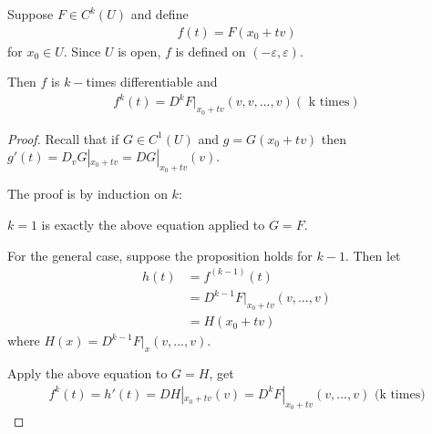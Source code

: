 \documentclass[a4paper]{article}
\begin{document}
\begin{prop}
Suppose $F \in C^k (U)$ and define
\begin{equation*}
\begin{aligned}
f(t)=F(x_0+tv)
\end{aligned}
\end{equation*}
for $x_0 \in U$. Since $U$ is open, $f$ is defined on $(-\varepsilon,\varepsilon)$.

Then $f$ is $k-$times differentiable and
\begin{equation*}
\begin{aligned}
f^k(t)=D^k F|_{x_0+tv}(v,v,...,v) (\text{ k times})
\end{aligned}
\end{equation*}
\begin{proof}
Recall that if $G \in C^1(U)$ and $g=G(x_0+tv)$ then $g'(t) = D_v G|_{x_0+tv}=DG|_{x_0+tv}(v)$.

The proof is by induction on $k$:

$k=1$ is exactly the above equation applied to $G=F$.

For the general case, suppose the proposition holds for $k-1$. Then let
\begin{equation*}
\begin{aligned}
h(t)&=f^{(k-1)}(t)\\
&=D^{k-1} F|_{x_0+tv}(v,...,v)\\
&= H(x_0+tv)
\end{aligned}
\end{equation*}
where $H(x)=D^{k-1}F|_x (v,...,v)$.

Apply the above equation to $G=H$, get
\begin{equation*}
\begin{aligned}
f^k(t)=h'(t)=DH|_{x_0+tv}(v)=D^k F|_{x_0+tv}(v,...,v) \text{ (k times)}
\end{aligned}
\end{equation*}
\end{proof}
\end{prop}
\end{document}
